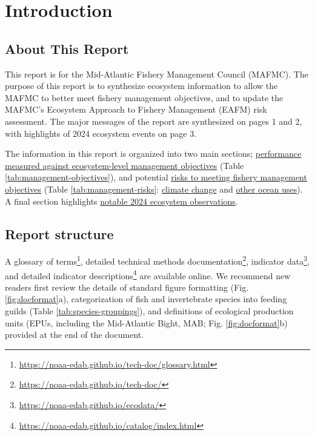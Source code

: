 \documentclass[
  10pt,
]{article}
\author{}
\date{\vspace{-2.5em}}
\begin{document}
\setcounter{page}{4}
\thispagestyle{fancy}

\section{Introduction}\label{introduction}

\subsection{About This Report}\label{about-this-report}

This report is for the Mid-Atlantic Fishery Management Council (MAFMC). The purpose of this report is to synthesize ecosystem information to allow the MAFMC to better meet fishery management objectives, and to update the MAFMC's Ecosystem Approach to Fishery Management (EAFM) risk assessment. The major messages of the report are synthesized on pages 1 and 2, with highlights of 2024 ecosystem events on page 3.

The information in this report is organized into two main sections; \hyperref[performance-relative-to-fishery-management-objectives]{performance measured against ecosystem-level management objectives} (Table \ref{tab:management-objectives}), and potential \hyperref[risks-to-meeting-fishery-management-objectives]{risks to meeting fishery management objectives} (Table \ref{tab:management-risks}: \hyperref[climate-and-ecosystem-change]{climate change} and \hyperref[other-ocean-uses-offshore-wind]{other ocean uses}). A final section highlights \hyperref[highlights]{notable 2024 ecosystem observations}.

\subsection{Report structure}\label{report-structure}

A glossary of terms\footnote{\url{https://noaa-edab.github.io/tech-doc/glossary.html}}, detailed technical methods documentation\footnote{\url{https://noaa-edab.github.io/tech-doc/}}, indicator data\footnote{\url{https://noaa-edab.github.io/ecodata/}}, and detailed indicator descriptions\footnote{\url{https://noaa-edab.github.io/catalog/index.html}} are available online. We recommend new readers first review the details of standard figure formatting (Fig. \ref{fig:docformat}a), categorization of fish and invertebrate species into feeding guilds (Table \ref{tab:species-groupings}), and definitions of ecological production units (EPUs, including the Mid-Atlantic Bight, MAB; Fig. \ref{fig:docformat}b) provided at the end of the document.
\end{document}
